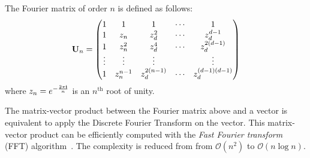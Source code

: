 \begin{definition}
  The Fourier matrix of order $n$ is defined as follows:
  \begin{equation}
    \mathbf{U}_n = 
    \begin{pmatrix}
      1      & 1           & 1              & \cdots & 1           \\
      1      & z_n       & z_d^2        & \cdots & z_d^{d-1} \\
      1      & z_n^2     & z_d^4        & \cdots & z_d^{2(d-1)} \\
      \vdots & \vdots      & \vdots         &        & \vdots      \\
      1      & z_n^{n-1} & z_d^{2(n-1)} & \cdots & z_d^{(d-1)(d-1)}
    \end{pmatrix}
  \end{equation}
  where $z_n = e^{-\frac{2\pi\mathbf{i}}{n}}$ is an $n^{\text{th}}$ root of unity.
  \label{definition:ch2-fourier_matrix}
\end{definition}
\noindent
The matrix-vector product between the Fourier matrix above and a vector is equivalent to apply the Discrete Fourier Transform on the vector.
This matrix-vector product can be efficiently computed with the \emph{Fast Fourier transform} (FFT) algorithm~\cite{cooley1965algorithm}.
The complexity is reduced from from $\mathcal{O}(n^2)$ to $\mathcal{O}(n \log n)$.

